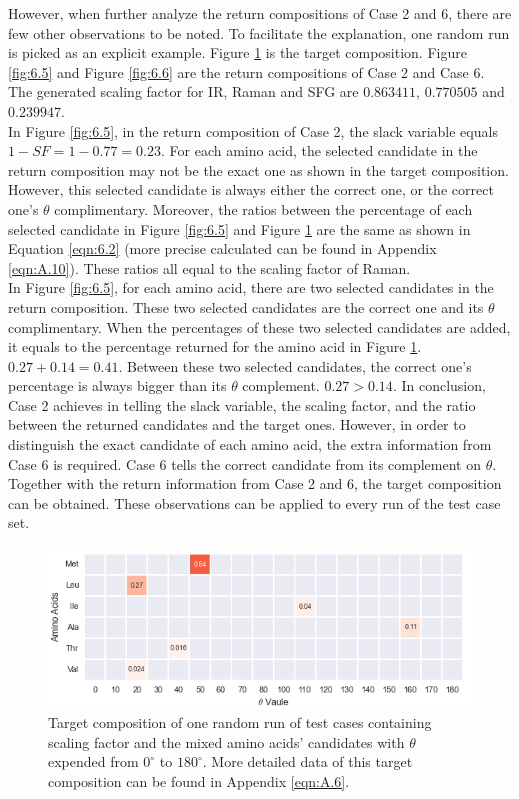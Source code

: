 However, when further analyze the return compositions of Case 2 and 6, there are few other observations to be noted. To facilitate the explanation, one random run is picked as an explicit example. Figure \ref{fig:6.4} is the target composition. Figure \ref{fig:6.5} and Figure \ref{fig:6.6} are the return compositions of Case 2 and Case 6. The generated scaling factor for IR, Raman and SFG are $0.863411$, $0.770505$ and $0.239947$. \\

In Figure \ref{fig:6.5}, in the return composition of Case 2, the slack variable equals $1-SF = 1-0.77 = 0.23$. For each amino acid, the selected candidate in the return composition may not be the exact one as shown in the target composition. However, this selected candidate is always either the correct one, or the correct one's $\theta$ complimentary. Moreover, the ratios between the percentage of each selected candidate in Figure \ref{fig:6.5} and Figure \ref{fig:6.4} are the same as shown in Equation \ref{eqn:6.2} (more precise calculated can be found in Appendix \ref{eqn:A.10}). These ratios all equal to the scaling factor of Raman. \\

In Figure \ref{fig:6.5}, for each amino acid, there are two selected candidates in the return composition. These two selected candidates are the correct one and its $\theta$ complimentary. When the percentages of these two selected candidates are added, it equals to the percentage returned for the amino acid in Figure \ref{fig:6.4}. $0.27 + 0.14 = 0.41$. Between these two selected candidates, the correct one's percentage is always bigger than its $\theta$ complement. $0.27 > 0.14$. In conclusion, Case 2 achieves in telling the slack variable, the scaling factor, and the ratio between the returned candidates and the target ones. However, in order to distinguish the exact candidate of each amino acid, the extra information from Case 6 is required. Case 6 tells the correct candidate from its complement on $\theta$. Together with the return information from Case 2 and 6, the target composition can be obtained. These observations can be applied to every run of the test case set.\\


\begin{figure}[!ht] 
\centering
\includegraphics[scale=0.9]{Figures/chapter6_figure_five.png}
\caption{Target composition of one random run of test cases containing scaling factor and the mixed amino acids' candidates with $\theta$ expended from $0^{\circ}$ to $180^{\circ}$. More detailed data of this target composition can be found in Appendix \ref{eqn:A.6}.} \label{fig:6.4}
\end{figure}

